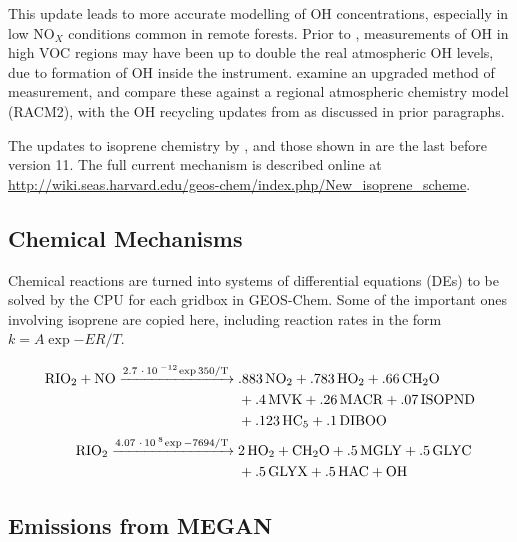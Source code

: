       This update leads to more accurate modelling of OH concentrations, especially in low NO$_X$ conditions common in remote forests.
      Prior to \textcite{Mao2012}, measurements of OH in high VOC regions may have been up to double the real atmospheric OH levels, due to formation of OH inside the instrument.
      \textcite{Mao2012} examine an upgraded method of measurement, and compare these against a regional atmospheric chemistry model (RACM2), with the OH recycling updates from \textcite{Paulot2009b} as discussed in prior paragraphs.
      
      The updates to isoprene chemistry by \textcite{Mao2013}, and those shown in \textcite{Crounse2011,Crounse2012} are the last before version 11.
      The full current mechanism is described online at \url{http://wiki.seas.harvard.edu/geos-chem/index.php/New_isoprene_scheme}.
  
  \subsection{Chemical Mechanisms}
    \label{Model:GC:Mechanisms}
    Chemical reactions are turned into systems of differential equations (DEs) to be solved by the CPU for each gridbox in GEOS-Chem.
    Some of the important ones involving isoprene are copied here, including reaction rates in the form $ k = A \exp{-ER/T} $.
    
    \begin{align} \begin{split}
    \label{Model:GC:Mechanisms:eqn_mechanisms}
    \ce{
      RIO2 + NO ->[2.7*10^{-12} \exp{350/T}] & .883NO2 + .783HO2 + .66CH2O \\
      & + .4MVK + .26MACR + .07ISOPND \\
      & + .123HC5 + .1DIBOO \\
      RIO2 ->[4.07*10^{8} \exp{-7694/T}] & 2HO2 + CH2O + .5MGLY + .5GLYC \\
      & + .5GLYX + .5HAC + OH
    }
    \end{split} \end{align}
  
  
  \subsection{Emissions from MEGAN}
    \label{Model:GC:Isop:MEGAN}

